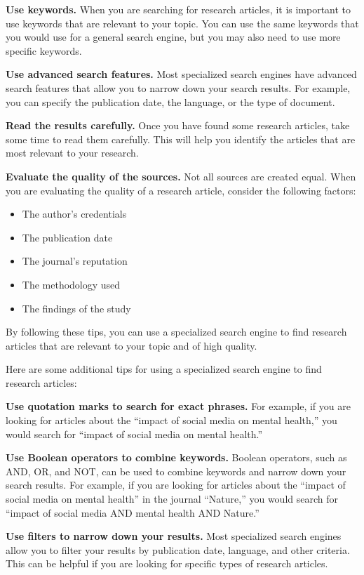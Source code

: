 \documentclass[
  b5paper]{book}
\begin{document}
\textbf{Use keywords.} When you are searching for research articles, it is important to use keywords that are relevant to your topic. You can use the same keywords that you would use for a general search engine, but you may also need to use more specific keywords.

\textbf{Use advanced search features.} Most specialized search engines have advanced search features that allow you to narrow down your search results. For example, you can specify the publication date, the language, or the type of document.

\textbf{Read the results carefully.} Once you have found some research articles, take some time to read them carefully. This will help you identify the articles that are most relevant to your research.

\textbf{Evaluate the quality of the sources.} Not all sources are created equal. When you are evaluating the quality of a research article, consider the following factors:

\begin{itemize}
\item
  The author's credentials
\item
  The publication date
\item
  The journal's reputation
\item
  The methodology used
\item
  The findings of the study
\end{itemize}

By following these tips, you can use a specialized search engine to find research articles that are relevant to your topic and of high quality.

Here are some additional tips for using a specialized search engine to find research articles:

\textbf{Use quotation marks to search for exact phrases.} For example, if you are looking for articles about the ``impact of social media on mental health,'' you would search for ``impact of social media on mental health.''

\textbf{Use Boolean operators to combine keywords.} Boolean operators, such as AND, OR, and NOT, can be used to combine keywords and narrow down your search results. For example, if you are looking for articles about the ``impact of social media on mental health'' in the journal ``Nature,'' you would search for ``impact of social media AND mental health AND Nature.''

\textbf{Use filters to narrow down your results.} Most specialized search engines allow you to filter your results by publication date, language, and other criteria. This can be helpful if you are looking for specific types of research articles.
\end{document}
